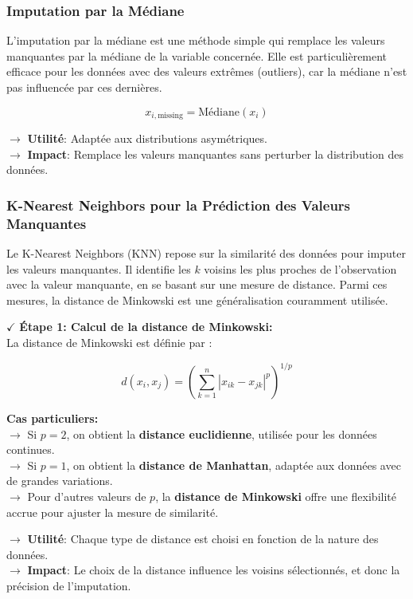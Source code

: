 \subsubsection{Imputation par la Médiane}

L’imputation par la médiane est une méthode simple qui remplace les valeurs manquantes par la médiane de la variable concernée. Elle est particulièrement efficace pour les données avec des valeurs extrêmes (outliers), car la médiane n'est pas influencée par ces dernières.

\[
x_{i,\text{missing}} = \text{Médiane}(x_i)
\]

\noindent \textbf{\(\rightarrow\)} \textbf{Utilité}: Adaptée aux distributions asymétriques.\\
\textbf{\(\rightarrow\)} \textbf{Impact}: Remplace les valeurs manquantes sans perturber la distribution des données.

\subsubsection{K-Nearest Neighbors pour la Prédiction des Valeurs Manquantes}

Le K-Nearest Neighbors (KNN) repose sur la similarité des données pour imputer les valeurs manquantes. Il identifie les \(k\) voisins les plus proches de l'observation avec la valeur manquante, en se basant sur une mesure de distance. Parmi ces mesures, la distance de Minkowski est une généralisation couramment utilisée.

\textbf{\(\checkmark\)} \textbf{Étape 1: Calcul de la distance de Minkowski:} \\
La distance de Minkowski est définie par :

\[
d(x_i, x_j) = \left( \sum_{k=1}^{n} |x_{ik} - x_{jk}|^p \right)^{1/p}
\]

\textbf{Cas particuliers:}\\
\textbf{\(\rightarrow\)} Si \( p = 2 \), on obtient la \textbf{distance euclidienne}, utilisée pour les données continues.\\
\textbf{\(\rightarrow\)} Si \( p = 1 \), on obtient la \textbf{distance de Manhattan}, adaptée aux données avec de grandes variations.\\
\textbf{\(\rightarrow\)} Pour d'autres valeurs de \( p \), la \textbf{distance de Minkowski} offre une flexibilité accrue pour ajuster la mesure de similarité.

\noindent \textbf{\(\rightarrow\)} \textbf{Utilité}: Chaque type de distance est choisi en fonction de la nature des données.\\
\textbf{\(\rightarrow\)} \textbf{Impact}: Le choix de la distance influence les voisins sélectionnés, et donc la précision de l'imputation.


